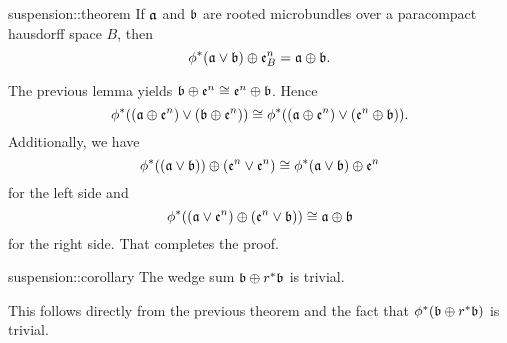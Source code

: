 \begin{mytheorem}{suspension::theorem}
    If $\mathfrak{a}$ and $\mathfrak{b}$ are rooted microbundles over a paracompact hausdorff space $B$, then
    \[ \phi^*(\mathfrak{a} \vee \mathfrak{b}) \oplus{} \mathfrak{e}^{n}_B = \mathfrak{a} \oplus{} \mathfrak{b}. \]
\end{mytheorem}

\begin{myproof}
    The previous lemma yields $\mathfrak{b} \oplus{} \mathfrak{e}^{n} \cong \mathfrak{e}^{n} \oplus{} \mathfrak{b}$.
    Hence
    \[ \phi^*((\mathfrak{a} \oplus{} \mathfrak{e}^{n}) \vee (\mathfrak{b} \oplus{} \mathfrak{e}^{n})) \cong \phi^*((\mathfrak{a} \oplus{} \mathfrak{e}^{n}) \vee (\mathfrak{e}^{n} \oplus{} \mathfrak{b})). \]
    Additionally, we have
    \[ \phi^*((\mathfrak{a} \vee \mathfrak{b})) \oplus{} (\mathfrak{e}^{n} \vee \mathfrak{e}^{n}) \cong \phi^*(\mathfrak{a} \vee \mathfrak{b}) \oplus{} \mathfrak{e}^{n} \]
    for the left side and
    \[ \phi^*((\mathfrak{a} \vee \mathfrak{e}^{n}) \oplus{} (\mathfrak{e}^{n} \vee \mathfrak{b})) \cong \mathfrak{a} \oplus{} \mathfrak{b}\]
    for the right side. That completes the proof.
\end{myproof}

\begin{mycorollary}{suspension::corollary}
    The wedge sum $\mathfrak{b} \oplus{} r^*\mathfrak{b}$ is trivial.
\end{mycorollary}

\begin{myproof}
    This follows directly from the previous theorem and the fact that $\phi^*(\mathfrak{b} \oplus{} r^*\mathfrak{b})$ is trivial.
\end{myproof}

